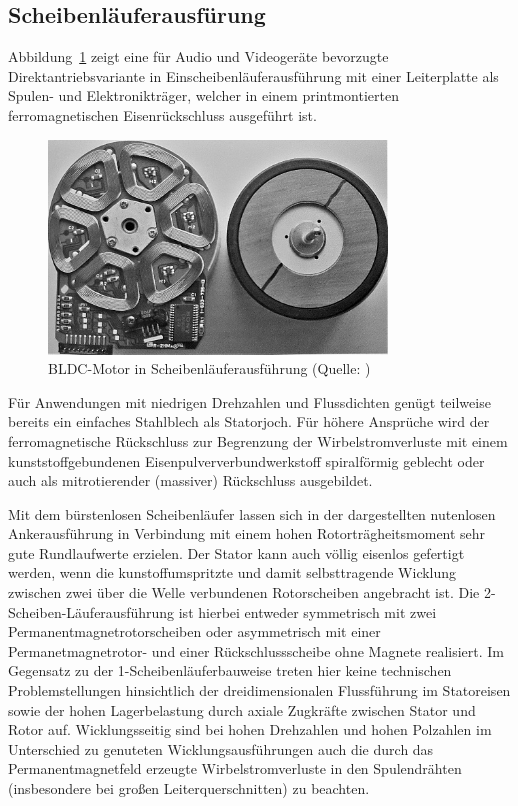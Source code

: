 \subsection{Scheibenläuferausfürung}

Abbildung~\ref{fig:3_3} zeigt eine für Audio und Videogeräte bevorzugte Direktantriebsvariante in Einscheibenläuferausführung mit einer Leiterplatte als Spulen- und Elektronikträger, welcher in einem printmontierten ferromagnetischen Eisenrückschluss ausgeführt ist.

\begin{figure}[h]
  \centering
  \includegraphics[width=9cm]{./Grafiken/3_3}
  \caption[BLDC-Motor in Scheibenläuferausfürung]{BLDC-Motor in Scheibenläuferausführung (Quelle: \parencite[S. 77]{Stölting2011})}%
  \label{fig:3_3}
\end{figure}

Für Anwendungen mit niedrigen Drehzahlen und Flussdichten genügt teilweise bereits ein einfaches Stahlblech als Statorjoch. Für höhere Ansprüche wird der ferromagnetische Rückschluss zur Begrenzung der Wirbelstromverluste mit einem kunststoffgebundenen Eisenpulververbundwerkstoff spiralförmig geblecht oder auch als mitrotierender (massiver) Rückschluss ausgebildet.

Mit dem bürstenlosen Scheibenläufer lassen sich in der dargestellten nutenlosen Ankerausführung in Verbindung mit einem hohen Rotorträgheitsmoment sehr gute Rundlaufwerte erzielen. Der Stator kann auch völlig eisenlos gefertigt werden, wenn die kunstoffumspritzte und damit selbsttragende Wicklung zwischen zwei über die Welle verbundenen Rotorscheiben angebracht ist. Die 2-Scheiben-Läuferausführung ist hierbei entweder symmetrisch mit zwei Permanentmagnetrotorscheiben oder asymmetrisch mit einer Permanetmagnetrotor- und einer Rückschlussscheibe ohne Magnete realisiert. Im Gegensatz zu der 1-Scheibenläuferbauweise treten hier keine technischen Problemstellungen hinsichtlich der dreidimensionalen Flussführung im Statoreisen sowie der hohen Lagerbelastung durch axiale Zugkräfte zwischen Stator und Rotor auf. Wicklungsseitig sind bei hohen Drehzahlen und hohen Polzahlen im Unterschied zu genuteten Wicklungsausführungen auch die durch das Permanentmagnetfeld erzeugte Wirbelstromverluste in den Spulendrähten (insbesondere bei großen Leiterquerschnitten) zu beachten.

